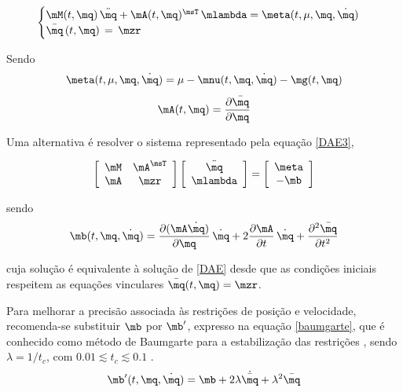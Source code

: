 \documentclass[]{politex}
\begin{document}
\begin{equation} \label{DAE}
\begin{cases}
\mM(t,\mq) \, \ddot{\mq} + \mA(t,\mq)^\msT \,\mlambda = \meta(t,\mu,\mq, \dot{\mq}) \\
\bar{\mq} \, (t,\mq) \, = \, \mzr
\end{cases}
\end{equation}

Sendo
\begin{equation}
\meta(t,\mu,\mq, \dot{\mq}) = \mu - \mnu(t,\mq,\dot{\mq}) - \mg(t,\mq)
\end{equation}
\begin{equation}
\mA(t,\mq) = \frac{\partial \bar{\mq}}{\partial \mq}
\end{equation}

Uma alternativa é resolver o sistema representado pela equação \eqref{DAE3}, 

\begin{equation}
\left[ \begin{array}{cc}
\mM & \mA^\msT \\
\mA & \mzr
\end{array}
\right]
\left[ \begin{array}{c}
\ddot{\mq} \\
\mlambda
\end{array}
\right] =
\left[ \begin{array}{c}
\meta \\
-\mb
\end{array}
\right]
\label{DAE3}
\end{equation}

\vspace{0.5cm}

sendo
\begin{equation}
\mb(t,\mq,\dot{\mq}) = \frac{\partial (\mA \dot{\mq})}{\partial \mq} \, \dot{\mq} + 2 \frac{\partial \mA}{\partial t} \, \dot{\mq} + \frac{\partial^2 \bar{\mq}}{\partial t^2}
\end{equation}

cuja solução é equivalente à solução de \eqref{DAE} desde que as condições iniciais respeitem as equações vinculares $\bar{\mq}(t, \mq) = \mzr$.

Para melhorar a precisão associada às restrições de posição e velocidade, recomenda-se substituir $\mb$ por $\mb'$, expresso na equação \eqref{baumgarte}, que é conhecido como método de Baumgarte para a estabilização das restrições \cite{Baumgarte, Featherstone, Nikravesh}, sendo $\lambda = 1/t_c$, com  $0.01 \lesssim t_c \lesssim 0.1 $ \cite{Featherstone}. 
%
\begin{equation}
\mb'(t,\mq,\dot{\mq}) = \mb + 2\lambda \dot{\bar{\mq}} + \lambda^2 \bar{\mq}
\label{baumgarte}
\end{equation}
\end{document}
